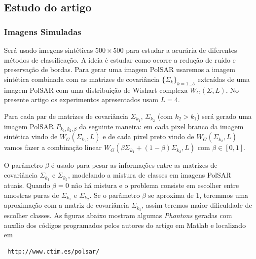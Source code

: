 \documentclass[12pt,a4paper]{article}
\begin{document}
\subsection{Estudo do artigo  \cite{gomez_frery_2017}}
\subsubsection{Imagens Simuladas}

Será usado imegens sintéticas $500 \times 500$ para estudar a acurária de diferentes métodos de classificação. A ideia é estudar como ocorre a redução de ruído e preservação de bordas. Para gerar uma imagem PolSAR usaremos a imagem sintética combinada com as matrizes de covariância $\{\Sigma_{k}\}_{k=1\dots5}$ extraídas de uma imagem PolSAR com uma distribuição de Wishart complexa $W_G(\Sigma, L)$. No presente artigo os experimentos apresentados usam $L=4$.

Para cada par de matrizes de covariância $\Sigma_{k_1}$, $\Sigma_{k_2}$ (com $k_2>k_1$) será gerado uma imagem PolSAR $P_{k_1,k_2,\beta}$ da seguinte maneira: em cada pixel branco da imagem sintética vindo de $W_G(\Sigma_{k_1}, L)$ e de cada pixel preto vindo de $W_G(\Sigma_{k_2},L)$ vamos fazer a combinação linear $W_G(\beta\Sigma_{k_1}+(1-\beta)\Sigma_{k_2}, L)$ com $\beta\in[0,1]$.

O parâmetro $\beta$ é usado para pesar as informações entre as matrizes de covariância $\Sigma_{k_1}$ e $\Sigma_{k_2}$, modelando a mistura de classes em imagens PolSAR atuais. Quando $\beta=0$ não há mistura e o problema consiste em escolher entre amostras puras de $\Sigma_{k_1}$ e $\Sigma_{k_2}$. Se o parâmetro $\beta$ se aproxima de $1$, teremmos uma aproximação com a matriz de covariância $\Sigma_{k_1}$, assim teremos maior dificuldade de escolher classes. As figuras abaixo mostram algumas {\it Phantons} geradas com auxílio dos códigos programados pelos autores do artigo em Matlab e localizado em  \begin{verbatim} http://www.ctim.es/polsar/\end{verbatim}
\end{document}
